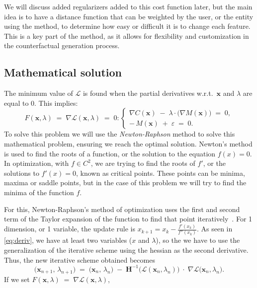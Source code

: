 \documentclass[12pt]{extarticle}
\numberwithin{equation}{section}
\begin{document}
We will discuss added regularizers added to this cost function later, but the main idea is to have a distance function that can be weighted by the user, or the entity using the method, to determine how easy or difficult it is to change each feature. This is a key part of the method, as it allows for flexibility and customization in the counterfactual generation process.

\subsection{Mathematical solution}\label{sec:mathematical}
The minimum value of $\mathcal{L}$ is found when the partial derivatives 
w.r.t.\ $\mathbf{x}$ and $\lambda$ are equal to 0. This implies:
\begin{equation}\label{eq:deriv}
F(\mathbf{x}, \lambda) \;=\; \nabla \mathcal{L}(\mathbf{x}, \lambda) \;=\; 0:
\begin{cases}
\nabla C(\mathbf{x}) \;-\;\lambda \cdot \bigl(\nabla M(\mathbf{x})\bigr) \;=\; 0, \\
-\,M(\mathbf{x})\;+\;\varepsilon\;=\;0.
\end{cases}
\end{equation}
To solve this problem we will use the \emph{Newton-Raphson} method to solve this mathematical problem, ensuring we reach the optimal solution. Newton's method is used to find the roots of a function, or the solution to the equation $f(x) = 0$. In optimization, with $f \in C^2$, we are trying to find the roots of $f'$, or the solutions to $f'(x) = 0$, known as critical points. These points can be minima, maxima or saddle points, but in the case of this problem we will try to find the minima of the function $f$. \par
For this, Newton-Raphson’s method of optimization uses the first and second term of the Taylor expansion of the function to find that point iteratively~\cite{fliege2009newton}. For 1 dimension, or 1 variable, the update rule is $x_{k+1}=x_{k}-{\frac {f'(x_{k})}{f''(x_{k})}}$. As seen in \eqref{eq:deriv}, we have at least two variables ($x$ and $\lambda$), so the we have to use the generalization of the iterative scheme using the hessian as the second derivative. Thus, the new iterative scheme obtained becomes
\[
\bigl(\mathbf{x}_{n+1},\,\lambda_{n+1}\bigr)
\;=\;
\bigl(\mathbf{x}_n,\,\lambda_n\bigr)
\;-\;
\mathbf{H}^{-1}\!\bigl(\mathcal{L}(\mathbf{x}_n,\lambda_n)\bigr)
\;\cdot\;
\nabla\mathcal{L}\bigl(\mathbf{x}_n,\lambda_n\bigr).
\]
If we set $F(\mathbf{x},\lambda) \;=\;\nabla \mathcal{L}(\mathbf{x},\lambda)$, 
\end{document}
